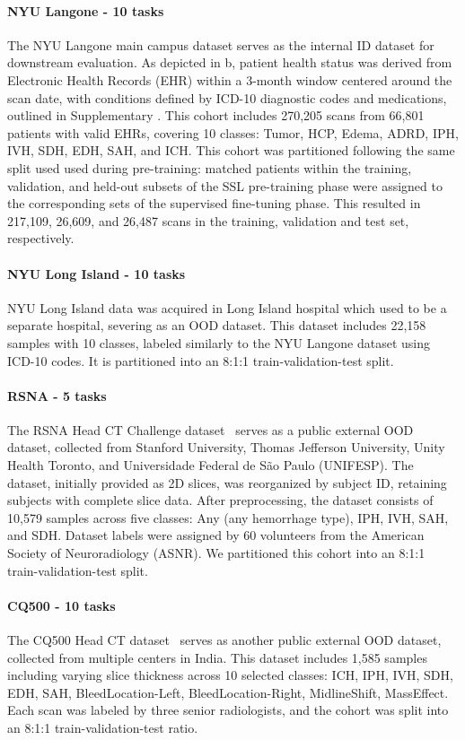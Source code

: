 \documentclass[fleqn,10pt]{wlscirep}
\begin{document}
\paragraph{NYU Langone - 10 tasks} The NYU Langone main campus dataset serves as the internal ID dataset for downstream evaluation. As depicted in b, patient health status was derived from Electronic Health Records (EHR) within a 3-month window centered around the scan date, with conditions defined by ICD-10 diagnostic codes and medications, outlined in Supplementary . This cohort includes 270,205 scans from 66,801 patients with valid EHRs, covering 10 classes: Tumor, HCP, Edema, ADRD, IPH, IVH, SDH, EDH, SAH, and ICH. This cohort was partitioned following the same split used used during pre-training: matched patients within the training, validation, and held-out subsets of the SSL pre-training phase were assigned to the corresponding sets of the supervised fine-tuning phase. This resulted in 217,109, 26,609, and 26,487 scans in the training, validation and test set, respectively.
\paragraph{NYU Long Island - 10 tasks} NYU Long Island data was acquired in Long Island hospital which used to be a separate hospital, severing as an OOD dataset. This dataset includes 22,158 samples with 10 classes, labeled similarly to the NYU Langone dataset using ICD-10 codes. It is partitioned into an 8:1:1 train-validation-test split.
\paragraph{RSNA - 5 tasks} The RSNA Head CT Challenge dataset~\cite{flanders_construction_2020} serves as a public external OOD dataset, collected from Stanford University, Thomas Jefferson University, Unity Health Toronto, and Universidade Federal de São Paulo (UNIFESP). The dataset, initially provided as 2D slices, was reorganized by subject ID, retaining subjects with complete slice data. After preprocessing, the dataset consists of 10,579 samples across five classes: Any (any hemorrhage type), IPH, IVH, SAH, and SDH. Dataset labels were assigned by 60 volunteers from the American Society of Neuroradiology (ASNR). We partitioned this cohort into an 8:1:1 train-validation-test split.
\paragraph{CQ500 - 10 tasks} The CQ500 Head CT dataset~\cite{CQ500} serves as another public external OOD dataset, collected from multiple centers in India. This dataset includes 1,585 samples including varying slice thickness across 10 selected classes: ICH, IPH, IVH, SDH, EDH, SAH, BleedLocation-Left, BleedLocation-Right, MidlineShift, MassEffect. Each scan was labeled by three senior radiologists, and the cohort was split into an 8:1:1 train-validation-test ratio.
\end{document}
